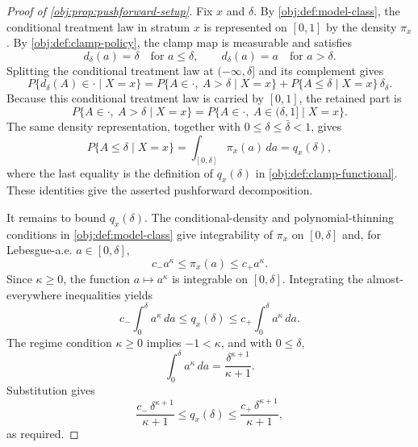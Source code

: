 \documentclass[11pt]{article}
\begin{document}
\begin{proof}[Proof of \cref{obj:prop:pushforward-setup}]
Fix \(x\) and \(\delta\).  By \cref{obj:def:model-class}, the conditional treatment law in stratum \(x\) is represented on \([0,1]\) by the density \(\pi_x\).  By \cref{obj:def:clamp-policy}, the clamp map is measurable and satisfies
\[
d_\delta(a)=\delta\quad\text{for }a\leq\delta,
\qquad
d_\delta(a)=a\quad\text{for }a>\delta .
\]
Splitting the conditional treatment law at \((-\infty,\delta]\) and its complement gives
\[
P\{d_\delta(A)\in\cdot\mid X=x\}
=
P\{A\in\cdot,\ A>\delta\mid X=x\}
+
P\{A\leq\delta\mid X=x\}\,\delta_\delta .
\]%
Because this conditional treatment law is carried by \([0,1]\), the retained part is
\[
P\{A\in\cdot,\ A>\delta\mid X=x\}
=
P\{A\in\cdot,\ A\in(\delta,1]\mid X=x\}.
\]%
The same density representation, together with \(0\leq\delta\leq\bar\delta<1\), gives
\[
P\{A\leq\delta\mid X=x\}
=
\int_{[0,\delta]}\pi_x(a)\,da
=
q_x(\delta),
\]%
where the last equality is the definition of \(q_x(\delta)\) in \cref{obj:def:clamp-functional}.  These identities give the asserted pushforward decomposition.

It remains to bound \(q_x(\delta)\).  The conditional-density and polynomial-thinning conditions in \cref{obj:def:model-class} give integrability of \(\pi_x\) on \([0,\delta]\) and, for Lebesgue-a.e. \(a\in[0,\delta]\),
\[
c_-a^\kappa\leq \pi_x(a)\leq c_+a^\kappa .
\]%
Since \(\kappa\geq0\), the function \(a\mapsto a^\kappa\) is integrable on \([0,\delta]\).  Integrating the almost-everywhere inequalities yields
\[
c_-\int_0^\delta a^\kappa\,da
\leq
q_x(\delta)
\leq
c_+\int_0^\delta a^\kappa\,da .
\]%
The regime condition \(\kappa\geq0\) implies \(-1<\kappa\), and with \(0\leq\delta\),
\[
\int_0^\delta a^\kappa\,da
=
\frac{\delta^{\kappa+1}}{\kappa+1}.
\]%
Substitution gives
\[
\frac{c_-\,\delta^{\kappa+1}}{\kappa+1}
\leq
q_x(\delta)
\leq
\frac{c_+\,\delta^{\kappa+1}}{\kappa+1},
\]
as required.
\end{proof}
\end{document}
